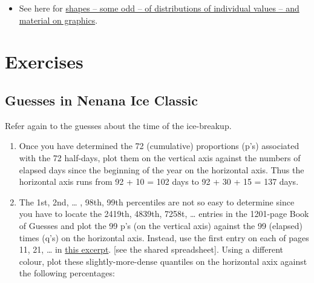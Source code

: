 \documentclass[]{book}
\newenvironment{Shaded}{\begin{snugshade}}{\end{snugshade}}
\newcommand{\DataTypeTok}[1]{\textcolor[rgb]{0.13,0.29,0.53}{#1}}
\newcommand{\DecValTok}[1]{\textcolor[rgb]{0.00,0.00,0.81}{#1}}
\newcommand{\KeywordTok}[1]{\textcolor[rgb]{0.13,0.29,0.53}{\textbf{#1}}}
\newcommand{\NormalTok}[1]{#1}
\newcommand{\OperatorTok}[1]{\textcolor[rgb]{0.81,0.36,0.00}{\textbf{#1}}}
\newcommand{\StringTok}[1]{\textcolor[rgb]{0.31,0.60,0.02}{#1}}
\begin{document}
\begin{itemize}
\item
  See here for \href{http://www.medicine.mcgill.ca/epidemiology/hanley/bios601/DescriptiveStatistics/}{shapes -- some odd -- of distributions of individual values -- and material on graphics}.
\end{itemize}

\hypertarget{exercises-4}{%
\section{Exercises}\label{exercises-4}}

\hypertarget{guesses-in-nenana-ice-classic}{%
\subsection{Guesses in Nenana Ice Classic}\label{guesses-in-nenana-ice-classic}}

Refer again to the guesses about the time of the ice-breakup.

\begin{enumerate}
\def\labelenumi{\arabic{enumi}.}
\item
  Once you have determined the 72 (cumulative) proportions (p's) associated with the 72 half-days, plot them on the vertical axis against the numbers of elapsed days since the beginning of the year on the horizontal axis. Thus the horizontal axis runs from 92 + 10 = 102 days to 92 + 30 + 15 = 137 days.
\item
  The 1st, 2nd, \ldots{} , 98th, 99th percentiles are not so easy to determine since you have to locate the 2419th, 4839th, 7258t, \ldots{} entries in the 1201-page Book of Guesses and plot the 99 p's (on the vertical axis) against the 99 (elapsed) times (q's) on the horizontal axis. Instead, use the first entry on each of pages 11, 21, \ldots{} in
  \href{http://www.biostat.mcgill.ca/hanley/bios691/SampledPages.pdf}{this excerpt}. {[}see the shared spreadsheet{]}. Using a different colour, plot these slightly-more-dense quantiles on the horizontal axix against the following percentages:
\end{enumerate}

\begin{Shaded}
\end{Shaded}
\end{document}
